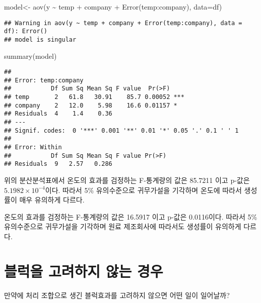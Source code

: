 \documentclass[
]{book}
\newenvironment{Shaded}{\begin{snugshade}}{\end{snugshade}}
\newcommand{\AttributeTok}[1]{\textcolor[rgb]{0.77,0.63,0.00}{#1}}
\newcommand{\FunctionTok}[1]{\textcolor[rgb]{0.00,0.00,0.00}{#1}}
\newcommand{\NormalTok}[1]{#1}
\newcommand{\OtherTok}[1]{\textcolor[rgb]{0.56,0.35,0.01}{#1}}
\newcommand{\SpecialCharTok}[1]{\textcolor[rgb]{0.00,0.00,0.00}{#1}}
\begin{document}
\begin{Shaded}
\begin{Highlighting}[]
\NormalTok{model}\OtherTok{\textless{}{-}} \FunctionTok{aov}\NormalTok{(y }\SpecialCharTok{\textasciitilde{}}\NormalTok{ temp }\SpecialCharTok{+}\NormalTok{ company }\SpecialCharTok{+} \FunctionTok{Error}\NormalTok{(temp}\SpecialCharTok{:}\NormalTok{company), }\AttributeTok{data=}\NormalTok{df)}
\end{Highlighting}
\end{Shaded}

\begin{verbatim}
## Warning in aov(y ~ temp + company + Error(temp:company), data = df): Error()
## model is singular
\end{verbatim}

\begin{Shaded}
\begin{Highlighting}[]
\FunctionTok{summary}\NormalTok{(model)}
\end{Highlighting}
\end{Shaded}

\begin{verbatim}
## 
## Error: temp:company
##           Df Sum Sq Mean Sq F value  Pr(>F)    
## temp       2   61.8   30.91    85.7 0.00052 ***
## company    2   12.0    5.98    16.6 0.01157 *  
## Residuals  4    1.4    0.36                    
## ---
## Signif. codes:  0 '***' 0.001 '**' 0.01 '*' 0.05 '.' 0.1 ' ' 1
## 
## Error: Within
##           Df Sum Sq Mean Sq F value Pr(>F)
## Residuals  9   2.57   0.286
\end{verbatim}

위의 분산분석표에서 온도의 효과를 검정하는 F-통계량의 값은 85.7211 이고 p-값은 \ensuremath{5.1982\times 10^{-4}}이다. 따라서 5\% 유의수준으로 귀무가설을 기각하며 온도에 따라서 생성률이 매우 유의하게 다르다.

온도의 효과를 검정하는 F-통계량의 값은 16.5917 이고 p-값은 0.0116이다. 따라서 5\% 유의수준으로 귀무가설을 기각하며 원료 제조회사에 따라서도 생성률이 유의하게 다르다.

\hypertarget{uxbe14uxb7eduxc744-uxace0uxb824uxd558uxc9c0-uxc54auxb294-uxacbduxc6b0}{%
\section{블럭을 고려하지 않는 경우}\label{uxbe14uxb7eduxc744-uxace0uxb824uxd558uxc9c0-uxc54auxb294-uxacbduxc6b0}}

만약에 처리 조합으로 생긴 블럭효과를 고려하지 않으면 어떤 일이 일어날까?
\end{document}
